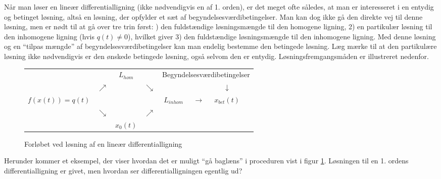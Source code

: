 \begin{info}
Når man løser en lineær differentialligning (ikke nødvendigvis en af 1. orden), er det meget ofte således, at man er interesseret i en entydig og betinget løsning, altså en løsning, der opfylder et sæt af begyndelsesværdibetingelser. Man kan dog ikke gå den direkte vej til denne løsning, men er nødt til at gå over tre trin først: ) den fuldstændige løsningsmængde til den homogene ligning, 2) en partikulær løsning til den inhomogene ligning (hvis $ q(t) \neq 0 $), hvilket giver 3) den fuldstændige løsningsmængde til den inhomogene ligning. Med denne løsning og en ``tilpas mængde'' af begyndelsesværdibetingelser kan man endelig bestemme den betingede løsning. Læg mærke til at den partikulære løsning ikke nødvendigvis er den ønskede betingede løsning, også selvom den er entydig. Løsningsfremgangsmåden er illustreret nedenfor.
\end{info}
\begin{figure}[hbt]
\centering
\begin{tabular}{cccccccc}
                 &            & $L_{hom}$          &            &         \multicolumn{4}{c}{Begyndelsesværdibetingelser} \\
                 & $\nearrow$ &                & $\searrow$ &        &               & $\downarrow$ & \hspace*{5mm}\\
$f(x(t)) = q(t)$ &            &                &            & $L_{inhom}$ & $\rightarrow$ & $x_{bet}(t)$ & \\
                 & $\searrow$ &                & $\nearrow$ &        &               &  & \\
                 &            & $x_0(t)$          &            &        &               &  & \\
\end{tabular}
\caption{Forløbet ved løsning af en lineær differentialligning}
\label{fig.subsek.struktur1}
\end{figure}

Herunder kommer et eksempel, der viser hvordan det er muligt ``gå baglæns'' i proceduren vist i figur \ref{fig.subsek.struktur1}. Løsningen til en 1. ordens differentialligning er givet, men hvordan ser differentialligningen egentlig ud?

